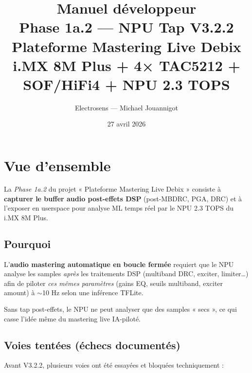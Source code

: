 \documentclass[11pt,a4paper]{article}
\title{\textbf{Manuel développeur \\ Phase 1a.2 — NPU Tap V3.2.2}\\[0.5em]
       \large Plateforme Mastering Live Debix\\
       i.MX 8M Plus + 4× TAC5212 + SOF/HiFi4 + NPU 2.3 TOPS}
\author{Electrosens — Michael Jouannigot}
\date{27 avril 2026}
\begin{document}
\maketitle
\thispagestyle{fancy}

\begin{center}
\end{center}

\tableofcontents
\newpage

\section{Vue d'ensemble}

La \emph{Phase 1a.2} du projet « Plateforme Mastering Live Debix » consiste à
\textbf{capturer le buffer audio post-effets DSP} (post-MBDRC, PGA, DRC) et à
l'exposer en userspace pour analyse ML temps réel par le NPU 2.3 TOPS du
i.MX 8M Plus.

\subsection{Pourquoi}

L'\textbf{audio mastering automatique en boucle fermée} requiert que le NPU
analyse les samples \emph{après} les traitements DSP (multiband DRC, exciter,
limiter…) afin de piloter \emph{ces mêmes paramètres} (gains EQ, seuils
multiband, exciter amount) à $\sim$10 Hz selon une inférence TFLite.

Sans tap post-effets, le NPU ne peut analyser que des samples « secs », ce qui
casse l'idée même du mastering live IA-piloté.

\subsection{Voies tentées (échecs documentés)}

Avant V3.2.2, plusieurs voies ont été essayées et bloquées techniquement :
\end{document}
